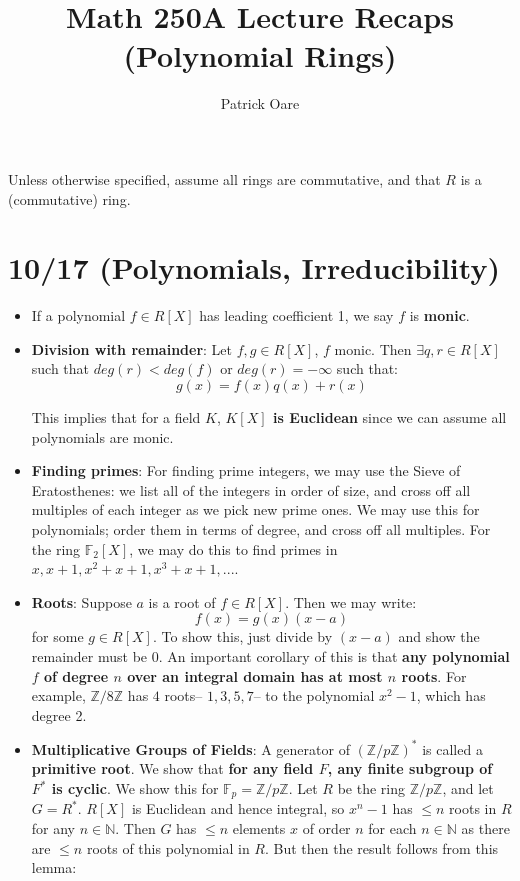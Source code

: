 \documentclass[11pt, oneside]{amsart}   	%
\title{Math 250A Lecture Recaps (Polynomial Rings)}
\author{Patrick Oare}
\theoremstyle{definition}
\begin{document}
\maketitle

Unless otherwise specified, assume all rings are commutative, and that $R$ is a (commutative) ring.

\section{10/17 (Polynomials, Irreducibility)}

\begin{itemize}

	\item If a polynomial $f\in R[X]$ has leading coefficient 1, we say $f$ is \textbf{monic}.

	\item \textbf{Division with remainder}: Let $f, g\in R[X]$, $f$ monic. Then $\exists q, r\in R[X]$ such that $deg(r) < deg(f)$ or $deg(r) = -\infty$ 
	such that:
	$$
		g(x) = f(x)q(x) + r(x)
	$$
	
	This implies that for a field $K$, \textbf{$K[X]$ is Euclidean} since we can assume all polynomials are monic.
	
	\item \textbf{Finding primes}: For finding prime integers, we may use the Sieve of Eratosthenes: we list all of the integers in order of size, 
	and cross off all multiples of each integer as we pick new prime ones. We may use this for polynomials; order them in terms of degree, and 
	cross off all multiples. For the ring $\mathbb F_2[X]$, we may do this to find primes in $x, x + 1, x^2 + x + 1, x^3 + x + 1, ...$.
	
	\item \textbf{Roots}: Suppose $a$ is a root of $f\in R[X]$. Then we may write:
	$$
		f(x) = g(x)(x - a)
	$$
	for some $g\in R[X]$. To show this, just divide by $(x - a)$ and show the remainder must be 0. An important corollary of this is that \textbf{any 
	polynomial $f$ of degree $n$ over an integral domain has at most $n$ roots}. For example, $\mathbb Z / 8\mathbb Z$ has $4$ roots-- 
	$1, 3, 5, 7$-- to the polynomial $x^2 - 1$, which has degree 2.
	
	\item \textbf{Multiplicative Groups of Fields}: A generator of $(\mathbb Z / p\mathbb Z)^*$ is called a \textbf{primitive root}. We show that 
	\textbf{for any field $F$, any finite subgroup of $F^*$ is cyclic}. We show this for $\mathbb F_p = \mathbb Z / p \mathbb Z$. Let $R$ be the ring 
	$\mathbb Z / p \mathbb Z$, and let $G = R^*$. $R[X]$ is Euclidean and hence integral, so $x^n - 1$ has $\leq n$ roots in $R$ for any $n \in 
	\mathbb N$. Then $G$ has $\leq n$ elements $x$ of order $n$ for each $n\in \mathbb N$ as there are $\leq n$ roots of this polynomial in $R$. 
	But then the result follows from this lemma:
	

\end{itemize}
\end{document}
